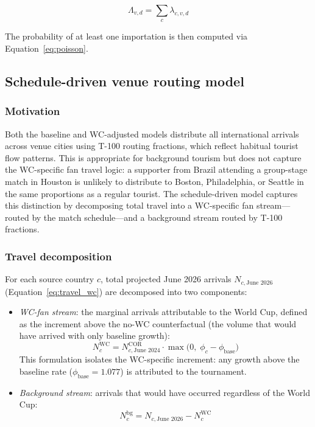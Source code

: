 \documentclass[12pt]{article}
\begin{document}
\begin{equation}
  \Lambda_{v,d} = \sum_{c} \lambda_{c,v,d}
\end{equation}

The probability of at least one importation is then computed via
Equation~\ref{eq:poisson}.

\subsection*{Schedule-driven venue routing model}

\subsubsection*{Motivation}

Both the baseline and WC-adjusted models distribute all international
arrivals across venue cities using T-100 routing fractions, which
reflect habitual tourist flow patterns. This is appropriate for
background tourism but does not capture the WC-specific fan travel
logic: a supporter from Brazil attending a group-stage match in
Houston is unlikely to distribute to Boston, Philadelphia, or Seattle
in the same proportions as a regular tourist. The schedule-driven
model captures this distinction by decomposing total travel into a
WC-specific fan stream---routed by the match schedule---and a
background stream routed by T-100 fractions.

\subsubsection*{Travel decomposition}

For each source country $c$, total projected June 2026 arrivals
$N_{c,\text{June 2026}}$ (Equation~\ref{eq:travel_wc}) are decomposed
into two components:

\begin{itemize}
  \item \textit{WC-fan stream}: the marginal arrivals attributable to the
    World Cup, defined as the increment above the no-WC counterfactual
    (the volume that would have arrived with only baseline growth):
    \begin{equation}
      N_c^{\text{WC}} = N_{c,\text{June 2024}}^{\text{COR}} \cdot
        \max\!\bigl(0,\; \phi_c - \phi_{\text{base}}\bigr)
      \label{eq:wc_fan_stream}
    \end{equation}
    This formulation isolates the WC-specific increment: any growth
    above the baseline rate ($\phi_{\text{base}} = 1.077$) is attributed
    to the tournament.

  \item \textit{Background stream}: arrivals that would have occurred
    regardless of the World Cup:
    \begin{equation}
      N_c^{\text{bg}} = N_{c,\text{June 2026}} - N_c^{\text{WC}}
      \label{eq:bg_stream}
    \end{equation}
\end{itemize}
\end{document}
